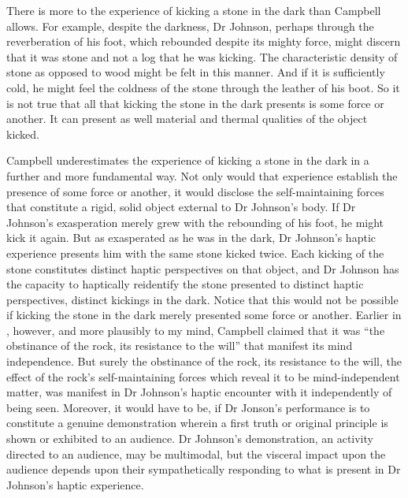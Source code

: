 
There is more to the experience of kicking a stone in the dark than Campbell allows. For example, despite the darkness, Dr Johnson, perhaps through the reverberation of his foot, which rebounded despite its mighty force, might discern that it was stone and not a log that he was kicking. The characteristic density of stone as opposed to wood might be felt in this manner. And if it is sufficiently cold, he might feel the coldness of the stone through the leather of his boot. So it is not true that all that kicking the stone in the dark presents is some force or another. It can present as well material and thermal qualities of the object kicked. 

Campbell underestimates the experience of kicking a stone in the dark in a further and more fundamental way. Not only would that experience establish the presence of some force or another, it would disclose the self-maintaining forces that constitute a rigid, solid object external to Dr Johnson's body. If Dr Johnson's exasperation merely grew with the rebounding of his foot, he might kick it again. But as exasperated as he was in the dark, Dr Johnson's haptic experience presents him with the same stone kicked twice. Each kicking of the stone constitutes distinct haptic perspectives on that object, and Dr Johnson has the capacity to haptically reidentify the stone presented to distinct haptic perspectives, distinct kickings in the dark. Notice that this would not be possible if kicking the stone in the dark merely presented some force or another. Earlier in \citet[26]{Campbell:2014aa}, however, and more plausibly to my mind, Campbell claimed that it was ``the obstinance of the rock, its resistance to the will'' that manifest its mind independence. But surely the obstinance of the rock, its resistance to the will, the effect of the rock's self-maintaining forces which reveal it to be mind-independent matter, was manifest in Dr Johnson's haptic encounter with it independently of being seen. Moreover, it would have to be, if Dr Jonson's performance is to constitute a genuine demonstration wherein a first truth or original principle is shown or exhibited to an audience. Dr Johnson's demonstration, an activity directed to an audience, may be multimodal, but the visceral impact upon the audience depends upon their sympathetically responding to what is present in Dr Johnson's haptic experience.

